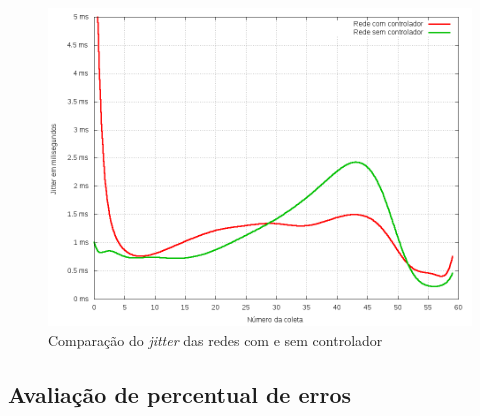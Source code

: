 \begin{figure}[!htb]
    \centering
    \label{fig:jitter-stats}
    \includegraphics[width=\linewidth]{img/jitter-stats}
    \caption{Comparação do \emph{jitter} das redes com e sem controlador}
\end{figure}


\subsection{Avaliação de percentual de erros}




